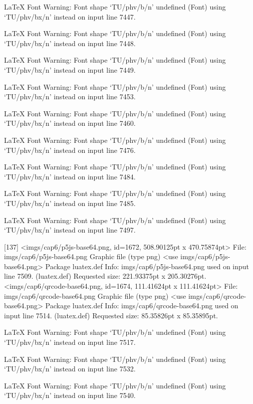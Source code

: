 LaTeX Font Warning: Font shape `TU/phv/b/n' undefined
(Font)              using `TU/phv/bx/n' instead on input line 7447.


LaTeX Font Warning: Font shape `TU/phv/b/n' undefined
(Font)              using `TU/phv/bx/n' instead on input line 7448.


LaTeX Font Warning: Font shape `TU/phv/b/n' undefined
(Font)              using `TU/phv/bx/n' instead on input line 7449.


LaTeX Font Warning: Font shape `TU/phv/b/n' undefined
(Font)              using `TU/phv/bx/n' instead on input line 7453.


LaTeX Font Warning: Font shape `TU/phv/b/n' undefined
(Font)              using `TU/phv/bx/n' instead on input line 7460.


LaTeX Font Warning: Font shape `TU/phv/b/n' undefined
(Font)              using `TU/phv/bx/n' instead on input line 7476.


LaTeX Font Warning: Font shape `TU/phv/b/n' undefined
(Font)              using `TU/phv/bx/n' instead on input line 7484.


LaTeX Font Warning: Font shape `TU/phv/b/n' undefined
(Font)              using `TU/phv/bx/n' instead on input line 7485.


LaTeX Font Warning: Font shape `TU/phv/b/n' undefined
(Font)              using `TU/phv/bx/n' instead on input line 7497.

[137]
<imgs/cap6/p5js-base64.png, id=1672, 508.90125pt x 470.75874pt>
File: imgs/cap6/p5js-base64.png Graphic file (type png)
<use imgs/cap6/p5js-base64.png>
Package luatex.def Info: imgs/cap6/p5js-base64.png  used on input line 7509.
(luatex.def)             Requested size: 221.93375pt x 205.30276pt.
<imgs/cap6/qrcode-base64.png, id=1674, 111.41624pt x 111.41624pt>
File: imgs/cap6/qrcode-base64.png Graphic file (type png)
<use imgs/cap6/qrcode-base64.png>
Package luatex.def Info: imgs/cap6/qrcode-base64.png  used on input line 7514.
(luatex.def)             Requested size: 85.35826pt x 85.35895pt.

LaTeX Font Warning: Font shape `TU/phv/b/n' undefined
(Font)              using `TU/phv/bx/n' instead on input line 7517.


LaTeX Font Warning: Font shape `TU/phv/b/n' undefined
(Font)              using `TU/phv/bx/n' instead on input line 7532.


LaTeX Font Warning: Font shape `TU/phv/b/n' undefined
(Font)              using `TU/phv/bx/n' instead on input line 7540.


